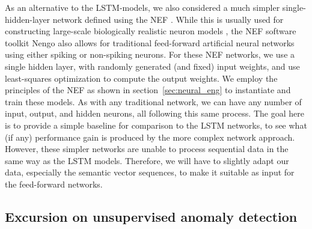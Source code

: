 As an alternative to the \ac{LSTM}-models, we also considered a much simpler single-hidden-layer network defined using the \acf{NEF} \parencite{Eliasmith2003}.
While this is usually used for constructing large-scale biologically realistic neuron models \parencite{Eliasmith2012}, the \ac{NEF} software toolkit \acs{Nengo} \parencite{Bekolay2014} also allows for traditional feed-forward artificial neural networks using either spiking or non-spiking neurons.
For these \ac{NEF} networks, we use a single hidden layer, with randomly generated (and fixed) input weights, and use least-squares optimization to compute the output weights.
We employ the principles of the \ac{NEF} as shown in section~\ref{sec:neural_eng} to instantiate and train these models.
As with any traditional network, we can have any number of input, output, and hidden neurons, all following this same process.
The goal here is to provide a simple baseline for comparison to the \ac{LSTM} networks, to see what (if any) performance gain is produced by the more complex network approach.
However, these simpler networks are unable to process sequential data in the same way as the \ac{LSTM} models.
Therefore, we will have to slightly adapt our data, especially the semantic vector sequences, to make it suitable as input for the feed-forward networks.

\subsection{Excursion on unsupervised anomaly detection}%
\label{subsec:excursion_on_unsupervised_anomaly_detection}

